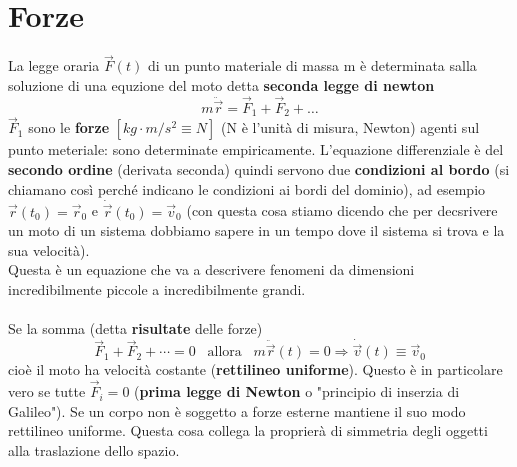 \newpage
\section{Forze}
La legge oraria $\vec{F}(t)$ di un punto materiale di massa m è determinata salla soluzione di una equzione
del moto detta \textbf{seconda legge di newton}
$$m\ddot{\vec{r}} = \vec{F}_1 + \vec{F}_2 + \dots$$
$\vec{F}_1$ sono le \textbf{forze} $[kg \cdot m/s^2 \equiv N]$ (N è l'unità di misura, Newton) agenti sul punto meteriale: sono determinate empiricamente.
L'equazione differenziale è del \textbf{secondo ordine} (derivata seconda) quindi servono due \textbf{condizioni al bordo} (si chiamano così perché indicano le 
condizioni ai bordi del dominio), ad esempio $\vec{r}(t_0) = \vec{r}_0$ e $\dot{\vec{r}}(t_0) = \vec{v}_0$ (con questa cosa stiamo dicendo che per decsrivere un moto di un sistema
dobbiamo sapere in un tempo dove il sistema si trova e la sua velocità).\\
Questa è un equazione che va a descrivere fenomeni da dimensioni incredibilmente piccole a incredibilmente grandi.\\\\
Se la somma (detta \textbf{risultate} delle forze)
$$\vec{F}_1 + \vec{F}_2 + \cdots = 0 \hspace{10pt}\text{allora}\hspace{10pt} m\ddot{\vec{r}}(t) = 0 \Rightarrow \dot{\vec{v}}(t) \equiv \vec{v}_0$$
cioè il moto ha velocità costante (\textbf{rettilineo uniforme}). Questo è in particolare vero se tutte $\vec{F}_i = 0$ 
(\textbf{prima legge di Newton} o "principio di inserzia di Galileo"). Se un corpo non è soggetto a forze esterne mantiene il suo modo rettilineo uniforme.
Questa cosa collega la proprierà di simmetria degli oggetti alla traslazione dello spazio.

